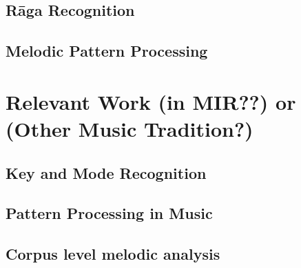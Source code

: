 {%
%
%

\subsection{R\={a}ga Recognition}

\subsection{Melodic Pattern Processing}



\section{Relevant Work (in MIR??) or (Other Music Tradition?)}
\label{sec:background_relevant_work_other_music}

\subsection{Key and Mode Recognition}

\subsection{Pattern Processing in Music}




\subsection{Corpus level melodic analysis}

}
